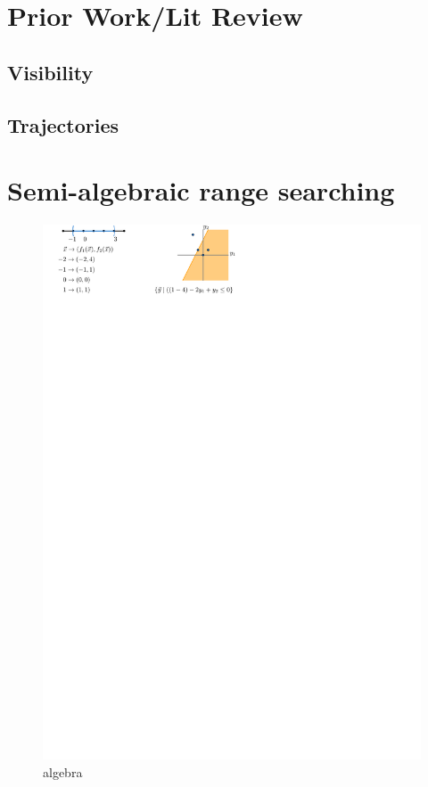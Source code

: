\documentclass[a4paper, UKenglish]{lipics-v2018}
\begin{document}
\section{Prior Work/Lit Review}
\subsection{Visibility}
\subsection{Trajectories}

\section{Semi-algebraic range searching}
\label{appx:rangesearch}


\begin{figure}[h]
    \centering
    \includegraphics{../algebraic}
    \caption{algebra}
    \label{fig:algebraic}
\end{figure}
\end{document}
